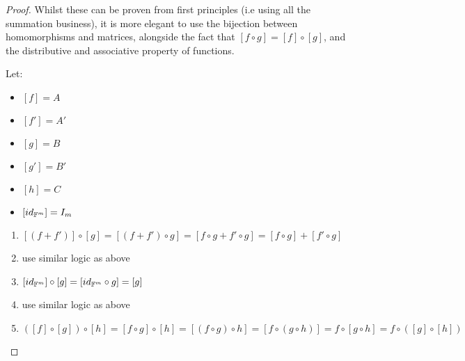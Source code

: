 \documentclass{exam}
\begin{document}

\begin{proof}

Whilst these can be proven from first principles (i.e using all the summation business), it is more elegant to use the bijection between homomorphisms and matrices, alongside the fact that $[f \circ g] = [f] \circ [g]$, and the distributive and associative property of functions.

\bigskip

Let:
\begin{itemize}
    \item $[f] = A$
    \item $[f'] = A'$
    \item $[g] = B$
    \item $[g'] = B'$
    \item $[h] = C$
    \item $[id_{\mathbb{F}^m}] = I_m$
\end{itemize}

\begin{enumerate}
    \item $[(f + f')] \circ [g] = [(f + f') \circ g] = [f \circ g + f' \circ g] = [f \circ g] + [f' \circ g]$
    \item use similar logic as above
    \item $[id_{\mathbb{F}^m}] \circ [g] = [id_{\mathbb{F}^m} \circ g] = [g]$
    \item use similar logic as above
    \item $([f] \circ [g]) \circ [h] = [f \circ g] \circ [h] = [(f \circ g) \circ h] = [f \circ (g \circ h)] = f \circ [g \circ h] = f \circ ([g] \circ [h]) $
\end{enumerate}

\end{proof}
\end{document}
